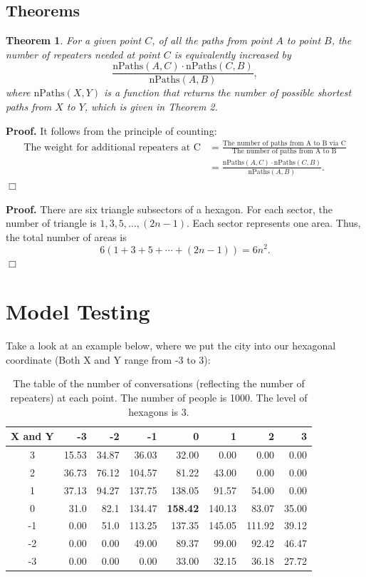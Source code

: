 \documentclass{icmmcm}
\newtheorem{Theo1}{Theorem}
\begin{document}
\subsection{Theorems}
\begin{Theo1}
For a given point $C$, of all the paths from point $A$ to point $B$, the number of repeaters needed at point $C$ is equivalently increased by 
$$\frac{\text{nPaths}(A,C)\cdot \text{nPaths}(C,B)}{\text{nPaths}(A,B)},$$
where $\text{nPaths}(X,Y)$ is a function that returns the number of possible \emph{shortest} paths from $X$ to $Y$, which is given in Theorem 2.
\end{Theo1}
{\bf Proof.}
It follows from the principle of counting:
\begin{align*} \text{The weight for additional repeaters at C}
&=\frac{\text{The number of paths from A to B via C}}{\text{The number of paths from A to B}}\\
&=\frac{\text{nPaths}(A,C)\cdot \text{nPaths}(C,B)}{\text{nPaths}(A,B)}.
\end{align*}\hfill $\Box$

{\bf Proof.}
There are six triangle subsectors of a hexagon. For each sector, the number of triangle is $1, 3, 5, \ldots, (2n-1)$. Each sector represents one area. Thus, the total number of areas is
$$6(1+ 3+ 5+\cdots+ (2n-1))=6n^2.$$\hfill $\Box$

\section{Model Testing}

Take a look at an example below, where we put the city into our hexagonal coordinate (Both X and Y range from -3 to 3):
\begin{table}[htbp]
  \begin{center}
    \begin{tabular}{@{}c|rrrrrrr@{}} \toprule
X and Y  	&-3 	&-2 		&-1		&0		&1		&2		&3\\ \midrule   
3&15.53	&34.87	&36.03	&32.00	&0.00	&0.00	&0.00    \\ 
2&36.73	&76.12	&104.57	&81.22	&43.00	&0.00	&0.00	\\
1&37.13	&94.27	&137.75	&138.05	&91.57	&54.00	&0.00	\\
0&31.0	&82.1	&134.47	&\textbf{158.42}	&140.13	&83.07	&35.00	\\
-1&0.00	&51.0	&113.25	&137.35	&145.05	&111.92	&39.12	\\
-2&0.00	&0.00	&49.00	&89.37	&99.00	&92.42	&46.47	\\
-3&0.00	&0.00	&0.00	&33.00	&32.15	&36.18	&27.72	\\
 \bottomrule	
    \end{tabular}
  \end{center}
  \caption[A Distribution of Repeaters for a Uniform Distribution of People]{The table of the number of conversations (reflecting the number of repeaters) at each point. The number of people is 1000. The level of hexagons is 3.}
  \label{tab:uniform}
\end{table}
\end{document}
